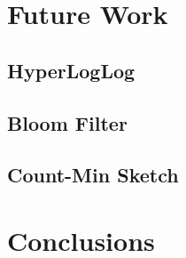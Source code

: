 \documentclass[11pt,oneside,a4paper]{article}
\makeatletter
\def\cleardoublepage{\clearpage\if@twoside \ifodd\c@page\else%
\hbox{}%
\thispagestyle{empty}%
\clearpage%
\if@twocolumn\hbox{}\clearpage\fi\fi\fi}
\makeatother
\begin{document}
\section{Future Work}
\subsection{HyperLogLog}
\subsection{Bloom Filter}
\subsection{Count-Min Sketch}
\section{Conclusions}
\cleardoublepage
{}

\cleardoublepage
\end{document}
